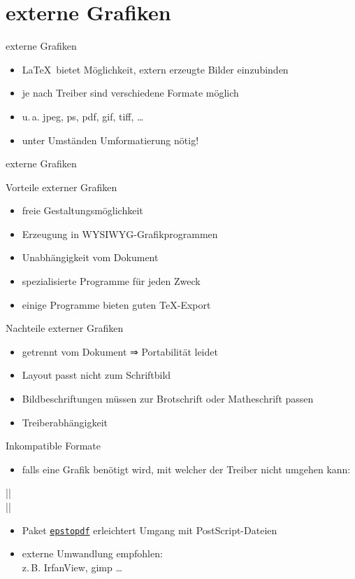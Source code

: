 \documentclass{beamer}
\newcommand{\meta}[1]{\textcolor{gray}{$\langle$\texttt{\textsl{#1}}$\rangle$}}
\newcommand{\pkg}[1]{\href{http://ctan.org/pkg/#1}{\alert{\texttt{#1}}}}
\begin{document}
\section{externe Grafiken}
\begin{frame}[fragile]{externe Grafiken}
	\begin{itemize}
		\item \LaTeX\ bietet Möglichkeit, extern erzeugte Bilder einzubinden
		\item je nach Treiber sind verschiedene Formate möglich
		\item u.\,a. jpeg, ps, pdf, gif, tiff, \dots
		\item unter Umständen Umformatierung nötig!
	\end{itemize}
\end{frame}

\begin{frame}{externe Grafiken}
\begin{block}{Vorteile externer Grafiken}
	\begin{itemize}
		\item freie Gestaltungsmöglichkeit
		\item Erzeugung in WYSIWYG-Grafikprogrammen
		\item Unabhängigkeit vom Dokument
		\item spezialisierte Programme für jeden Zweck
		\item einige Programme bieten guten \TeX-Export
	\end{itemize}
\end{block}
\pause
\begin{block}{Nachteile externer Grafiken}
	\begin{itemize}
		\item getrennt vom Dokument ⇒ Portabilität leidet
		\item Layout passt nicht zum Schriftbild
		\item Bildbeschriftungen müssen zur Brotschrift oder Matheschrift passen
		\item Treiberabhängigkeit
	\end{itemize}
\end{block}
\end{frame}

\begin{frame}[fragile]{Inkompatible Formate}
	\begin{itemize}
		\item falls eine Grafik benötigt wird, mit welcher der Treiber nicht umgehen kann:
	\end{itemize}
|\Declaregraphiksrule{|\meta{Endung}|}{|\meta{Typ}|}{|\meta{Größe}|}{|\meta{Befehl}|}|\\
||
	\begin{itemize}
		\item Paket \pkg{epstopdf} erleichtert Umgang mit PostScript-Dateien
		\item externe Umwandlung empfohlen:\\%
z.\,B. IrfanView, gimp \dots
	\end{itemize}
\end{frame}
\end{document}
